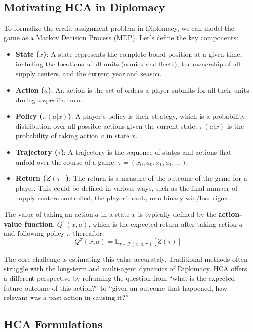 \documentclass[oneside]{memoir}
\begin{document}
\subsection{Motivating HCA in Diplomacy}

To formalize the credit assignment problem in Diplomacy, we can model the game as a Markov Decision Process (MDP). Let's define the key components:

\begin{itemize}
    \item \textbf{State ($x$)}: A state represents the complete board position at a given time, including the locations of all units (armies and fleets), the ownership of all supply centers, and the current year and season.
    \item \textbf{Action ($a$)}: An action is the set of orders a player submits for all their units during a specific turn.
    \item \textbf{Policy ($\pi(a|x)$)}: A player's policy is their strategy, which is a probability distribution over all possible actions given the current state. $\pi(a|x)$ is the probability of taking action $a$ in state $x$.
    \item \textbf{Trajectory ($\tau$)}: A trajectory is the sequence of states and actions that unfold over the course of a game, $\tau = (x_0, a_0, x_1, a_1, \dots)$.
    \item \textbf{Return ($Z(\tau)$)}: The return is a measure of the outcome of the game for a player. This could be defined in various ways, such as the final number of supply centers controlled, the player's rank, or a binary win/loss signal.
\end{itemize}

The value of taking an action $a$ in a state $x$ is typically defined by the \textbf{action-value function}, $Q^{\pi}(x, a)$, which is the expected return after taking action $a$ and following policy $\pi$ thereafter:
$$
Q^{\pi}(x, a) = \mathbb{E}_{\tau \sim \mathcal{T}(x, a, \pi)}[Z(\tau)]
$$

The core challenge is estimating this value accurately. Traditional methods often struggle with the long-term and multi-agent dynamics of Diplomacy. HCA offers a different perspective by reframing the question from ``what is the expected future outcome of this action?'' to ``given an outcome that happened, how relevant was a past action in causing it?''

\subsection{HCA Formulations}
\end{document}
